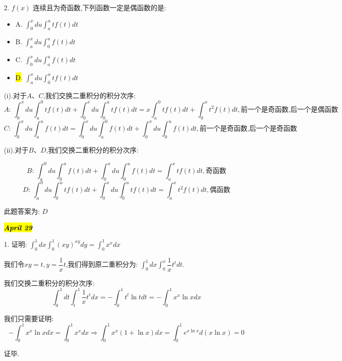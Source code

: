 2. $f(x)$ 连续且为奇函数,下列函数一定是偶函数的是: 
\begin{itemize}
	\item A. $\int_{0}^{x}du\int_{a}^{u}tf(t)dt$ 
	\item B. $\int_{a}^{x}du\int_{0}^{u}f(t)dt$ 
	\item C. $\int_{0}^{x}du\int_{a}^{u}f(t)dt$ 
	\item \hl{D}. $\int_{a}^{x}du\int_{0}^{u}tf(t)dt$ 
\end{itemize}
\begin{solution}
	
	(i).对于$A\text{、}C$,我们交换二重积分的积分次序: 
	$$A\text{: }\int_{0}^{x}du\int_{a}^{0}tf(t)dt+\int_{0}^{x}du\int_{0}^{u}tf(t)dt=x\int_{a}^{0}tf(t)dt+\int_{0}^{x}t^2f(t)dt,\text{前一个是奇函数,后一个是偶函数}$$
	$$C\text{: }\int_{0}^{x}du\int_{a}^{u}f(t)dt=\int_{0}^{x}du\int_{a}^{0}f(t)dt+\int_{0}^{x}du\int_{0}^{u}f(t)dt,\text{前一个是奇函数,后一个是奇函数}$$
	
	(ii).对于$B\text{、}D$,我们交换二重积分的积分次序: 
	
	$$B\text{: }\int_{a}^{0}du\int_{0}^{u}f(t)dt+\int_{0}^{x}du\int_{0}^{u}f(t)dt=\int_{a}^{x}tf(t)dt,\text{奇函数}$$
	$$D\text{: }\int_{a}^{0}du\int_{0}^{u}tf(t)dt+\int_{0}^{x}du\int_{0}^{u}tf(t)dt=\int_{a}^{x}t^2f(t)dt,\text{偶函数}$$
	
	此题答案为: $D$
\end{solution}

\hl{\textbf{\textit{April 29}}}

1. 证明:  $\int_{0}^{1}dx\int_{0}^{1}(xy)^{xy}dy=\int_{0}^{1}x^{x}dx$
\begin{solution}
	
	我们令$xy=t,y=\dfrac{1}{x}t$,我们得到原二重积分为: $\int_{0}^{1}dx\int_{0}^{x}\dfrac{1}{x}t^{t}dt$.
	
	我们交换二重积分的积分次序: 
	$$\int_{0}^{1}dt\int_{t}^{1}\frac{1}{x}t^{t}dx=-\int_{0}^{1}t^{t}\ln tdt=-\int_{0}^{1}x^{x}\ln xdx$$
	
	我们只需要证明: 
	$$-\int_{0}^{1}x^{x}\ln xdx=\int_{0}^{1}x^{x}dx\Rightarrow\int_{0}^{1}x^{x}(1+\ln x)dx=\int_{0}^{1}e^{x\ln x}d(x\ln x)=0$$
	
	证毕.
\end{solution}


